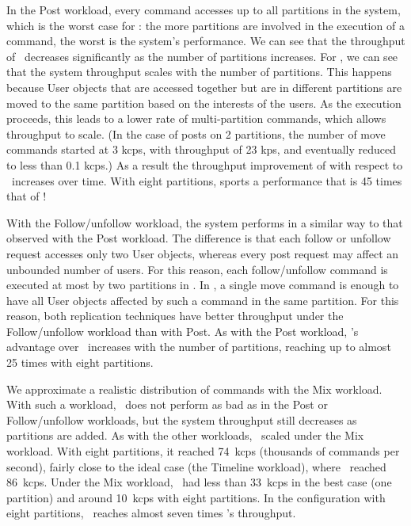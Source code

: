 In the Post workload, every command accesses up to all partitions in the system,
which is the worst case for \ssmr{}: the more partitions are involved in the
execution of a command, the worst is the system's performance. We can see that
the throughput of \ssmr\ decreases significantly as the number of partitions
increases. For \dssmr{}, we can see that the system throughput scales with the
number of partitions. This happens because User objects that are accessed
together but are in different partitions are moved to the same partition
based on the interests of the users. As the execution proceeds, this leads to a
lower rate of multi-partition commands, which allows throughput to scale. (In
the case of posts on 2 partitions, the number of move commands started at 3
kcps, with throughput of 23 kps, and eventually reduced to less than 0.1 kcps.)
As a result the throughput improvement of \dssmr{} with respect to \ssmr\
increases over time. With eight partitions, \dssmr{} sports a performance that
is 45 times that of \ssmr!

With the Follow/unfollow workload, the system performs in a similar way to that
observed with the Post workload. The difference is that each follow or unfollow
request accesses only two User objects, whereas every post request may affect an
unbounded number of users. For this reason, each follow/unfollow command is
executed at most by two partitions in \ssmr{}. In \dssmr{}, a single move
command is enough to have all User objects affected by such a command in the
same partition. For this reason, both replication techniques have better
throughput under the Follow/unfollow workload than with Post. As with the Post
workload, \dssmr{}'s advantage over \ssmr\ increases with the number of
partitions, reaching up to almost 25 times with eight partitions.

We approximate a realistic distribution of commands with the Mix workload. With
such a workload, \ssmr\ does not perform as bad as in the Post or
Follow/unfollow workloads, but the system throughput still decreases as
partitions are added. As with the other workloads, \dssmr\ scaled under the Mix
workload. With eight partitions, it reached 74~kcps (thousands of commands per
second), fairly close to the ideal case (the Timeline workload), where \dssmr\
reached 86~kcps. Under the Mix workload, \ssmr\ had less than 33~kcps in the
best case (one partition) and around 10~kcps with eight partitions. In the
configuration with eight partitions, \dssmr\ reaches almost seven times \ssmr's
throughput.

